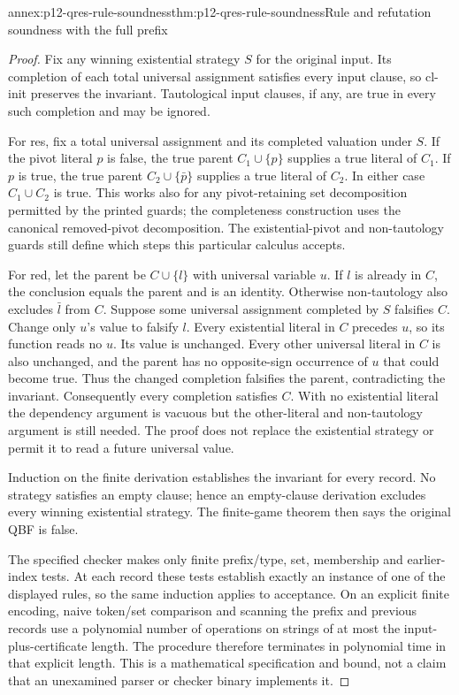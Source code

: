 \begin{annexitem}{annex:p12-qres-rule-soundness}{thm:p12-qres-rule-soundness}{Rule and refutation soundness with the full prefix}
\begin{proof}
Fix any winning existential strategy \(S\) for the original input.  Its
completion of each total universal assignment satisfies every input clause,
so cl-init preserves the invariant.  Tautological input clauses, if any,
are true in every such completion and may be ignored.

For res, fix a total universal assignment and its completed valuation under
\(S\).  If the pivot literal \(p\) is false, the true parent
\(C_1\cup\{p\}\) supplies a true literal of \(C_1\).  If \(p\)
is true, the true parent \(C_2\cup\{\bar p\}\) supplies a true literal
of \(C_2\).  In either case \(C_1\cup C_2\) is true.  This works
also for any pivot-retaining set decomposition permitted by the printed
guards; the completeness construction uses the canonical removed-pivot
decomposition.  The existential-pivot and non-tautology guards still define
which steps this particular calculus accepts.

For red, let the parent be \(C\cup\{l\}\) with universal variable \(u\).
If \(l\) is already in \(C\), the conclusion equals the parent and is
an identity.  Otherwise non-tautology also excludes \(\bar l\) from
\(C\).  Suppose some universal assignment completed by \(S\) falsifies
\(C\).  Change only \(u\)'s value to falsify \(l\).  Every existential
literal in \(C\) precedes \(u\), so its function reads no \(u\).
Its value is unchanged.  Every other universal literal in \(C\) is also
unchanged, and the parent has no opposite-sign occurrence of \(u\) that
could become true.  Thus the changed completion falsifies the parent,
contradicting the invariant.  Consequently every completion satisfies
\(C\).  With no existential literal the dependency argument is vacuous
but the other-literal and non-tautology argument is still needed.  The proof
does not replace the existential strategy or permit it to read a future
universal value.

Induction on the finite derivation establishes the invariant for every
record.  No strategy satisfies an empty clause; hence an empty-clause
derivation excludes every winning existential strategy.  The finite-game
theorem then says the original QBF is false.

The specified checker makes only finite prefix/type, set, membership and
earlier-index tests.  At each record these tests establish exactly an
instance of one of the displayed rules, so the same induction applies to
acceptance.  On an explicit finite encoding, naive token/set comparison and
scanning the prefix and previous records use a polynomial number of
operations on strings of at most the input-plus-certificate length.  The
procedure therefore terminates in polynomial time in that explicit length.
This is a mathematical specification and bound, not a claim that an
unexamined parser or checker binary implements it.
\end{proof}
\end{annexitem}

